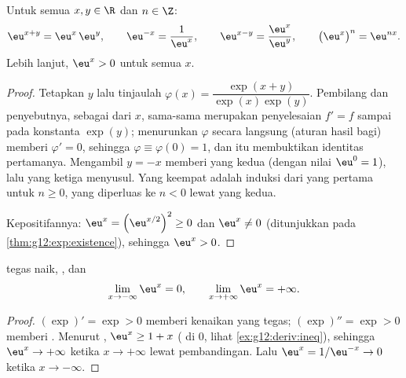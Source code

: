 \begin{proposition}\label{prop:g12:exp:funceq}
Untuk semua $x, y \in \R$ dan $n \in \Z$:
\[
\eu^{x+y} = \eu^x\,\eu^y, \qquad
\eu^{-x} = \frac{1}{\eu^x}, \qquad
\eu^{x-y} = \frac{\eu^x}{\eu^y}, \qquad
\bigl(\eu^{x}\bigr)^n = \eu^{nx}.
\]
Lebih lanjut, $\eu^x > 0$ untuk semua $x$.
\end{proposition}

\begin{proof}
Tetapkan $y$ lalu tinjaulah $\varphi(x) = \dfrac{\exp(x+y)}{\exp(x)\exp(y)}$.
Pembilang dan penyebutnya, sebagai  dari $x$, sama-sama merupakan
penyelesaian $f' = f$ sampai pada konstanta $\exp(y)$; menurunkan $\varphi$
secara langsung (aturan hasil bagi) memberi $\varphi' = 0$, sehingga
$\varphi \equiv \varphi(0) = 1$, dan itu membuktikan identitas pertamanya.
Mengambil $y = -x$ memberi yang kedua (dengan nilai $\eu^0 = 1$), lalu yang
ketiga menyusul. Yang keempat adalah induksi dari yang pertama untuk
$n \geq 0$, yang diperluas ke $n < 0$ lewat yang kedua.

Kepositifannya: $\eu^x = \left(\eu^{x/2}\right)^2 \geq 0$ dan $\eu^x \neq 0$
(ditunjukkan pada \cref{thm:g12:exp:existence}), sehingga $\eu^x > 0$.
\end{proof}

\begin{proposition}\label{prop:g12:exp:variations}
 tegas naik, , dan
\[
\lim_{x\to-\infty} \eu^x = 0, \qquad
\lim_{x\to+\infty} \eu^x = +\infty .
\]
\end{proposition}

\begin{proof}
$(\exp)' = \exp > 0$ memberi kenaikan yang tegas; $(\exp)'' = \exp > 0$
memberi . Menurut , $\eu^x \geq 1 + x$ ( di $0$, lihat \cref{ex:g12:deriv:ineq}), sehingga $\eu^x \to +\infty$
ketika $x \to +\infty$ lewat pembandingan. Lalu $\eu^{x} = 1/\eu^{-x} \to 0$
ketika $x \to -\infty$.
\end{proof}

